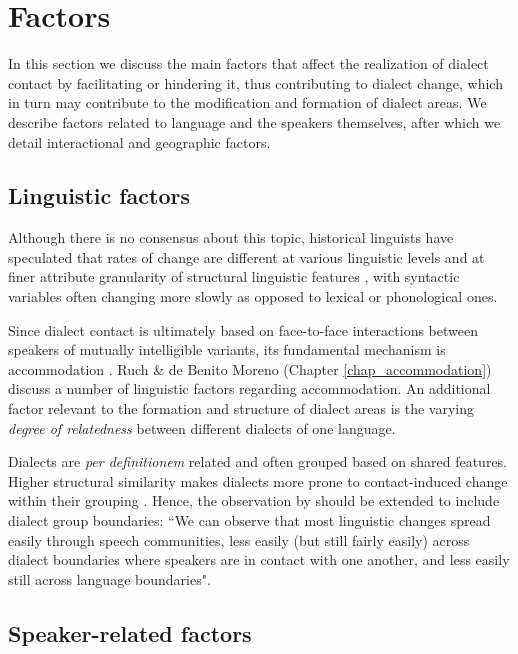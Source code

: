 \documentclass[output=paper]{langscibook}
\begin{document}
\section{Factors} 
\label{section:Factors}

In this section we discuss the main factors that affect the realization of dialect contact by facilitating or hindering it, thus contributing to  dialect change, which in turn may contribute to the modification and formation of  dialect areas. We describe factors related to language and the speakers themselves, after which we detail interactional and geographic factors.

\subsection{Linguistic factors}
Although there is no consensus about this topic, historical linguists have speculated that rates of change are different at various linguistic levels \parencite[e.g.,][1694--1695]{Longobardi2009} and at finer attribute granularity of structural linguistic features  \parencite[][]{Dediu2013}, with syntactic variables often changing more slowly as opposed to lexical or phonological ones.

Since dialect contact is ultimately based on face-to-face interactions between speakers of mutually intelligible variants, its fundamental mechanism  is accommodation \parencite[cf.][]{Trudgill1986}. Ruch \& de Benito Moreno (Chapter \ref{chap_accommodation}) discuss a number of linguistic factors regarding accommodation. An additional factor relevant to the formation and structure of dialect areas is the varying \textit{degree of relatedness} between different dialects of one language.

Dialects are \textit{per definitionem} related and often grouped based on shared features. Higher structural similarity makes dialects more prone to contact-induced change within their grouping \parencite[][74--75]{Trudgill1983}. Hence, the observation by \citet[][413]{Bowern2013a} should be extended to include dialect group boundaries: “We can observe that most linguistic changes spread easily through speech communities, less easily (but still fairly easily) across dialect boundaries where speakers are in contact with one another, and less easily still across language boundaries".




\subsection{Speaker-related factors}
\end{document}
